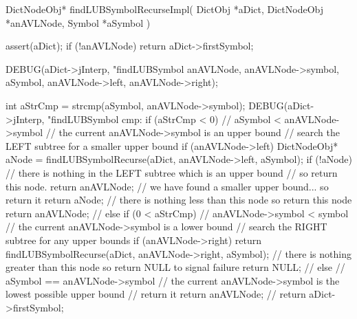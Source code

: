 DictNodeObj* findLUBSymbolRecurseImpl(
  DictObj     *aDict,
  DictNodeObj *anAVLNode,
  Symbol      *aSymbol
) {
  assert(aDict);
  if (!anAVLNode) return aDict->firstSymbol;

  DEBUG(aDict->jInterp,
        "findLUBSymbol %
        anAVLNode, anAVLNode->symbol, aSymbol,
        anAVLNode->left, anAVLNode->right);

  int aStrCmp = strcmp(aSymbol, anAVLNode->symbol);
  DEBUG(aDict->jInterp, "findLUBSymbol cmp: %
  if (aStrCmp < 0) {
    // aSymbol < anAVLNode->symbol
    // the current anAVLNode->symbol is an upper bound
    // search the LEFT subtree for a smaller upper bound
    if (anAVLNode->left) {
      DictNodeObj* aNode = findLUBSymbolRecurse(aDict, anAVLNode->left, aSymbol);
      if (!aNode) {
        // there is nothing in the LEFT subtree which is an upper bound
        // so return this node.
        return anAVLNode;
      }
      // we have found a smaller upper bound... so return it
      return aNode;
    }
    // there is nothing less than this node so return this node
    return anAVLNode;
    //
  } else if (0 < aStrCmp) {
    // anAVLNode->symbol < symbol
    // the current anAVLNode->symbol is a lower bound
    // search the RIGHT subtree for any upper bounds
    if (anAVLNode->right) {
      return findLUBSymbolRecurse(aDict, anAVLNode->right, aSymbol);
    }
    // there is nothing greater than this node so return NULL to signal failure
    return NULL;
    //
  } else {
    // aSymbol == anAVLNode->symbol
    // the current anAVLNode->symbol is the lowest possible upper bound
    // return it
    return anAVLNode;
    //
  }
  return aDict->firstSymbol;
}

